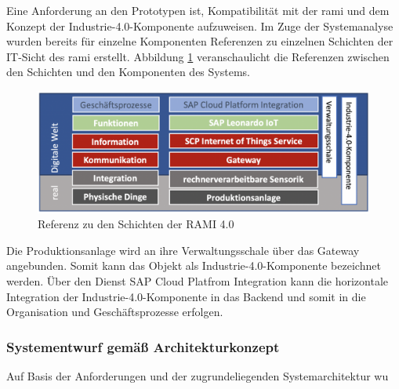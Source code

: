 Eine Anforderung an den Prototypen ist,  Kompatibilität mit der \ac{rami} und dem Konzept der Industrie-4.0-Komponente aufzuweisen. Im Zuge der Systemanalyse wurden bereits für einzelne Komponenten Referenzen zu einzelnen Schichten der IT-Sicht des \ac{rami} erstellt. Abbildung \ref{ramicustom} veranschaulicht die Referenzen zwischen den Schichten und den Komponenten des Systems.

\begin{figure}[H]
  \centering
  \includegraphics[width=1.0\linewidth]{pictures/ramicustom}
  \caption[Referenz zu den Schichten der RAMI 4.0]{Referenz zu den Schichten der RAMI 4.0}
  \label{ramicustom}
\end{figure}
 \noindent Die Produktionsanlage wird an ihre Verwaltungsschale über das Gateway angebunden. Somit kann das Objekt als Industrie-4.0-Komponente bezeichnet werden. Über den Dienst SAP Cloud Platfrom Integration kann die horizontale Integration der Industrie-4.0-Komponente in das Backend und somit in die Organisation und Geschäftsprozesse erfolgen.

\subsubsection{Systementwurf gemäß Architekturkonzept}

Auf Basis der Anforderungen und der zugrundeliegenden Systemarchitektur wu


